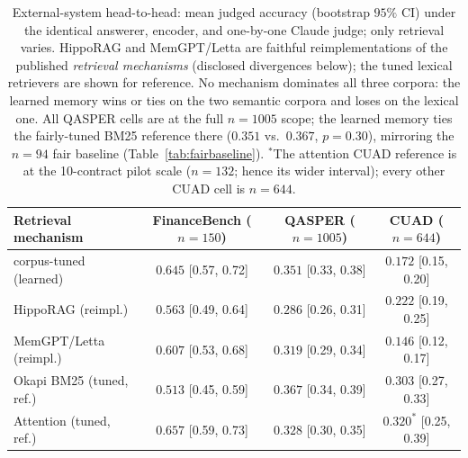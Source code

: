 \begin{table}[t]
  \centering
  \caption{External-system head-to-head: mean judged accuracy (bootstrap $95\%$
  CI) under the identical answerer, encoder, and one-by-one Claude judge; only
  retrieval varies. HippoRAG and MemGPT/Letta are faithful reimplementations of
  the published \emph{retrieval mechanisms} (disclosed divergences below); the
  tuned lexical retrievers are shown for reference. No mechanism dominates all
  three corpora: the learned memory wins or ties on the two semantic corpora and
  loses on the lexical one. All QASPER cells are at the full $n{=}1005$ scope; the
  learned memory ties the fairly-tuned BM25 reference there ($0.351$ vs.\ $0.367$,
  $p{=}0.30$), mirroring the $n{=}94$ fair baseline (Table~\ref{tab:fairbaseline}).
  $^{\ast}$The attention CUAD reference is at the 10-contract pilot scale
  ($n{=}132$; hence its wider interval); every other CUAD cell is $n{=}644$.}
  \label{tab:head2head}
  \footnotesize
  \begin{tabular}{lccc}
    \toprule
    Retrieval mechanism & FinanceBench ($n{=}150$) & QASPER ($n{=}1005$) & CUAD ($n{=}644$) \\
    \midrule
    \Vt{} corpus-tuned (learned)   & $0.645$ {\scriptsize[0.57, 0.72]} & $\mathbf{0.351}$ {\scriptsize[0.33, 0.38]} & $0.172$ {\scriptsize[0.15, 0.20]} \\
    HippoRAG (reimpl.)             & $0.563$ {\scriptsize[0.49, 0.64]} & $0.286$ {\scriptsize[0.26, 0.31]} & $\mathbf{0.222}$ {\scriptsize[0.19, 0.25]} \\
    MemGPT/Letta (reimpl.)         & $0.607$ {\scriptsize[0.53, 0.68]} & $0.319$ {\scriptsize[0.29, 0.34]} & $0.146$ {\scriptsize[0.12, 0.17]} \\
    \midrule
    Okapi BM25 (tuned, ref.)       & $0.513$ {\scriptsize[0.45, 0.59]} & $\mathbf{0.367}$ {\scriptsize[0.34, 0.39]} & $0.303$ {\scriptsize[0.27, 0.33]} \\
    Attention (tuned, ref.)        & $\mathbf{0.657}$ {\scriptsize[0.59, 0.73]} & $0.328$ {\scriptsize[0.30, 0.35]} & $0.320^{\ast}$ {\scriptsize[0.25, 0.39]} \\
    \bottomrule
  \end{tabular}
\end{table}

